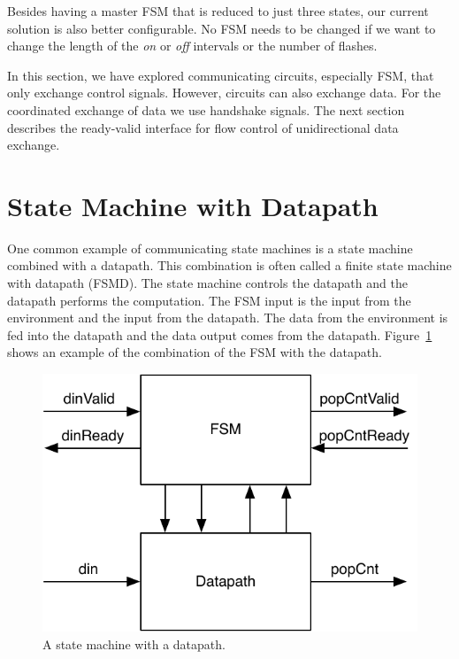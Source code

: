 \documentclass[%
    10pt,
    headinclude, footexclude,
    openright, %
    notitlepage,
    cleardoubleempty,
    headsepline,
    pointlessnumbers,
    bibtotoc, idxtotoc,
    ]{scrbook}
\newcommand{\scale}{0.7}
\begin{document}

Besides having a master FSM that is reduced to just three states, our current solution
is also better configurable. No FSM needs to be changed if we want to change
the length of the \emph{on} or \emph{off} intervals or the number of flashes.

In this section, we have explored communicating circuits, especially FSM, that
only exchange control signals. However, circuits can also exchange data.
For the coordinated exchange of data we use handshake signals.
The next section describes the ready-valid interface for flow control of
unidirectional data exchange.

\section{State Machine with Datapath}

One common example of communicating state machines is a state machine
combined with a datapath. This combination is often called a finite state machine
with datapath (FSMD). The state machine controls the datapath and the datapath
performs the computation. The FSM input is the input from the environment and the input
from the datapath. The data from the environment is fed into the datapath and the
data output comes from the datapath. Figure~\ref{fig:popcnt-fsmd} shows an example
of the combination of the FSM with the datapath.

\begin{figure}
  \centering
  \includegraphics[scale=\scale]{figures/popcnt-fsmd}
  \caption{A state machine with a datapath.}
  \label{fig:popcnt-fsmd}
\end{figure}
\end{document}
